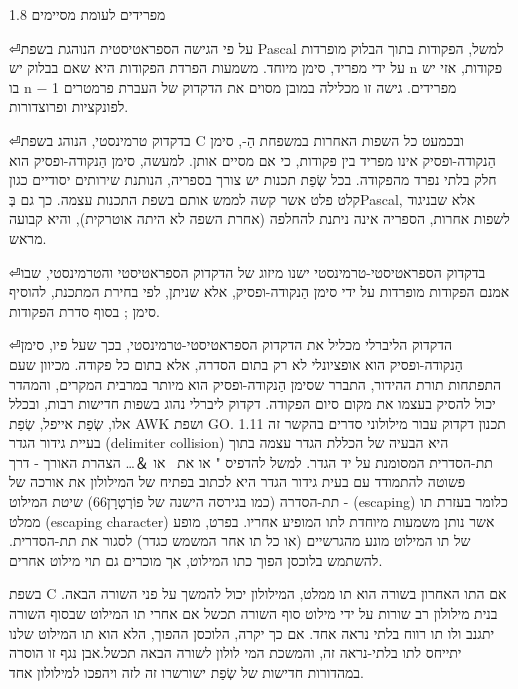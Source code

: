         1.8 מפרידים לעומת מסיימים
        \begin{ציינון}
⏎על פי הגישה הספראטיסטית הנוהגת בשפת Pascal למשל, הפקודות בתוך הבלוק מופרדות על ידי מפריד, סימן מיוחד. משמעות הפרדת הפקודות היא שאם בבלוק יש n פקודות, אזי יש בו n − 1 מפרידים.
        גישה זו מכלילה במובן מסוים את הדקדוק של העברת פרמטרים לפונקציות ופרוצדורות.
    \end{ציינון}

    \begin{ציינון}
⏎בדקדוק טרמינסטי, הנוהג בשפת C ובכמעט כל השפות האחרות במשפחת הַ-{}, סימן הַנקודה-ופסיק אינו מפריד בין פקודות, כי אם מסיים אותן. למעשה, סימן הַנקודה-ופסיק הוא חלק בלתי נפרד מהפקודה. בכל שְׂפַת תכנות יש צורך בספריה, הנותנת שירותים יסודיים כגון קלט פלט אשר קשה לממש אותם בשפת התכנות עצמה. כך גם בְּPascal, אלא שבניגוד לשפות אחרות, הספריה אינה ניתנת להחלפה (אחרת השפה לא היתה אוטרקית), והיא קבועה מראש.
      \end{ציינון}

      \begin{ציינון}
⏎בדקדוק הספראטיסטי-טרמינסטי ישנו מיזוג של הדקדוק הספראטיסטי והטרמינסטי, שבו אמנם הפקודות מופרדות על ידי סימן הַנקודה-ופסיק, אלא שניתן, לפי בחירת המתכנת, להוסיף סימן ; בסוף סדרת הפקודות.
      \end{ציינון}

      \begin{ציינון}
⏎הדקדוק הליברלי מכליל את הדקדוק הספראטיסטי-טרמינסטי, בכך שעל פיו, סימן הַנקודה-ופסיק הוא אופציונלי לא רק בתום הסדרה, אלא בתום כל פקודה.
        מכיוון שעם התפתחות תורת ההידור, התברר שסימן הַנקודה-ופסיק הוא מיותר במרבית המקרים, והמהדר יכול להסיק בעצמו את מקום סיום הפקודה.
        דקדוק ליברלי נהוג בשפות חדישות רבות, ובכלל אלו, שְׂפַת אייפל, שְׂפַת AWK ושפת GO.
        1.11 תכנון דקדוק עבור מילולוני סדרים
        בהקשר זה בעיית גידור הגדר (delimiter collision) היא הבעיה של הכללת הגדר עצמה בתוך תת-הסדרית המסומנת על יד הגדר. למשל להדפיס " או את \ או ＆…
        הצהרת האורך - דרך פשוטה להתמודד עם בעית גידור הגדר היא לכתוב בפתיח של המילולון את אורכה של תת-הסדרה (כמו בגירסה הישנה של פוֹרְטְרָן66)
        שיטת המילוט - (escaping) כלומר בעזרת תו ממלט (escaping character) אשר נותן משמעות מיוחדת לתו המופיע אחריו. בפרט, מופע של תו המילוט מונע מהגרשיים (או כל תו אחר המשמש כגדר) לסגור את תת-הסדרית. להשתמש בלוכסן הפוך כתו המילוט, אך מוכרים גם תוי מילוט אחרים.
    \end{ציינון}

        בשפת C אם התו האחרון בשורה הוא תו ממלט, המילולון יכול להמשך על פני השורה הבאה. בנית מילולון רב שורות על ידי מילוט סוף השורה תכשל אם אחרי תו המילוט שבסוף השורה יתגנב ולו תו רווח בלתי נראה אחד. אם כך יקרה, הלוכסן ההפוך, הלא הוא תו המילוט שלנו יתייחס לתו בלתי-נראה זה, והמשכת המי לולון לשורה הבאה תכשל.אבן נגף זו הוסרה במהדורות חדישות של שְׂפַת ישורשרו זה לזה ויהפכו למילולון אחד.

